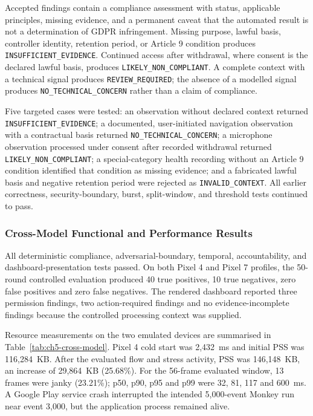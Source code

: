 Accepted findings contain a compliance assessment with status, applicable principles, missing evidence, and a permanent caveat that the automated result is not a determination of GDPR infringement. Missing purpose, lawful basis, controller identity, retention period, or Article 9 condition produces \texttt{INSUFFICIENT\_EVIDENCE}. Continued access after withdrawal, where consent is the declared lawful basis, produces \texttt{LIKELY\_NON\_COMPLIANT}. A complete context with a technical signal produces \texttt{REVIEW\_REQUIRED}; the absence of a modelled signal produces \texttt{NO\_TECHNICAL\_CONCERN} rather than a claim of compliance.

Five targeted cases were tested: an observation without declared context returned \texttt{INSUFFICIENT\_EVIDENCE}; a documented, user-initiated navigation observation with a contractual basis returned \texttt{NO\_TECHNICAL\_CONCERN}; a microphone observation processed under consent after recorded withdrawal returned \texttt{LIKELY\_NON\_COMPLIANT}; a special-category health recording without an Article 9 condition identified that condition as missing evidence; and a fabricated lawful basis and negative retention period were rejected as \texttt{INVALID\_CONTEXT}. All earlier correctness, security-boundary, burst, split-window, and threshold tests continued to pass.

\subsubsection{Cross-Model Functional and Performance Results}

All deterministic compliance, adversarial-boundary, temporal, accountability, and dashboard-presentation tests passed. On both Pixel 4 and Pixel 7 profiles, the 50-round controlled evaluation produced 40 true positives, 10 true negatives, zero false positives and zero false negatives. The rendered dashboard reported three permission findings, two action-required findings and no evidence-incomplete findings because the controlled processing context was supplied.

Resource measurements on the two emulated devices are summarised in Table~\ref{tab:ch5-cross-model}. Pixel 4 cold start was 2,432~ms and initial PSS was 116,284~KB. After the evaluated flow and stress activity, PSS was 146,148~KB, an increase of 29,864~KB (25.68\%). For the 56-frame evaluated window, 13 frames were janky (23.21\%); p50, p90, p95 and p99 were 32, 81, 117 and 600~ms. A Google Play service crash interrupted the intended 5,000-event Monkey run near event 3,000, but the application process remained alive.

